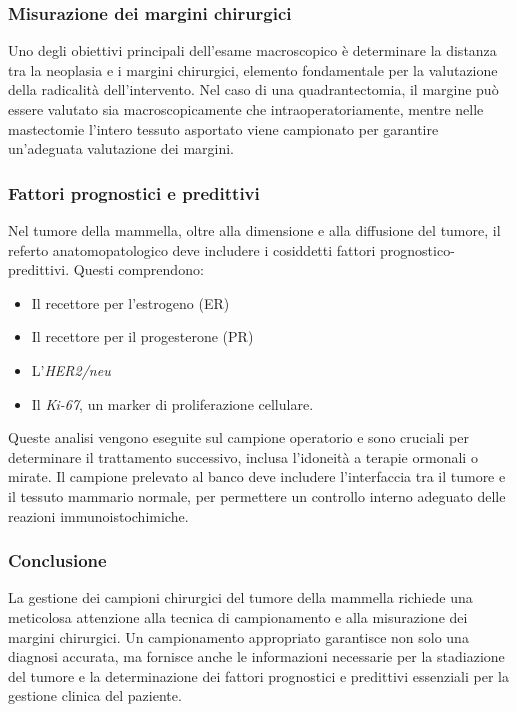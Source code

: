 \subsubsection{Misurazione dei margini chirurgici}
Uno degli obiettivi principali dell’esame macroscopico è determinare la distanza tra la neoplasia e i margini chirurgici, elemento fondamentale per la valutazione della radicalità dell’intervento. Nel caso di una quadrantectomia, il margine può essere valutato sia macroscopicamente che intraoperatoriamente, mentre nelle mastectomie l’intero tessuto asportato viene campionato per garantire un’adeguata valutazione dei margini.

\subsubsection{Fattori prognostici e predittivi}
Nel tumore della mammella, oltre alla dimensione e alla diffusione del tumore, il referto anatomopatologico deve includere i cosiddetti fattori prognostico-predittivi. Questi comprendono:
\begin{itemize}
    \item Il recettore per l'estrogeno (ER)
    \item Il recettore per il progesterone (PR)
    \item L’\textit{HER2/neu}
    \item Il \textit{Ki-67}, un marker di proliferazione cellulare.
\end{itemize}

Queste analisi vengono eseguite sul campione operatorio e sono cruciali per determinare il trattamento successivo, inclusa l’idoneità a terapie ormonali o mirate. Il campione prelevato al banco deve includere l'interfaccia tra il tumore e il tessuto mammario normale, per permettere un controllo interno adeguato delle reazioni immunoistochimiche.

\subsubsection{Conclusione}
La gestione dei campioni chirurgici del tumore della mammella richiede una meticolosa attenzione alla tecnica di campionamento e alla misurazione dei margini chirurgici. Un campionamento appropriato garantisce non solo una diagnosi accurata, ma fornisce anche le informazioni necessarie per la stadiazione del tumore e la determinazione dei fattori prognostici e predittivi essenziali per la gestione clinica del paziente.

